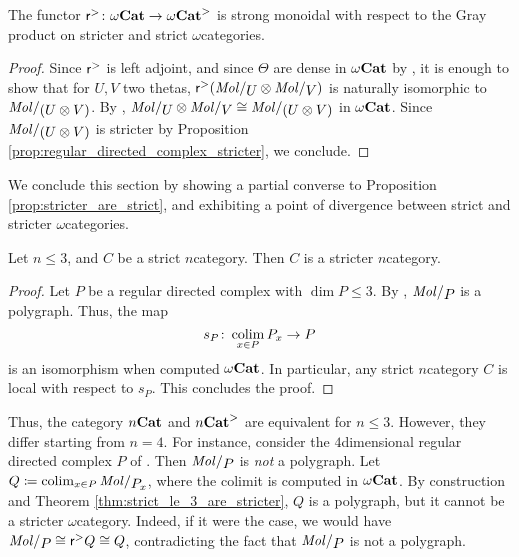 \begin{prop} \label{prop:reflection_to_stricter_monoidal}
    The functor \( \mathsf{r}^{>} \colon {\omega\mathbf{Cat}} \to {\omega\mathbf{Cat}}^> \) is strong monoidal with respect to the Gray product on stricter and strict \( \omega \)\nbd categories.
\end{prop}
\begin{proof}
    Since \( \mathsf{r}^{>} \) is left adjoint, and since \( \Theta \) are dense in \( {\omega\mathbf{Cat}} \) by \cite[Proposition 4.6]{ara2020joint}, it is enough to show that for \( U, V \) two thetas, \( \rcs (\molecin{U} \gray \molecin{V}) \) is naturally isomorphic to \( \molecin{(U \gray V)} \).
    By \cite[Lemma 9.1.16, Proposition 11.2.36]{hadzihasanovic2024combinatorics}, \( \molecin{U} \gray \molecin{V} \cong \molecin{(U \gray V)} \) in \( {\omega\mathbf{Cat}} \).
    Since \( \molecin{(U \gray V)} \) is stricter by Proposition \ref{prop:regular_directed_complex_stricter}, we conclude.
\end{proof}

\noindent We conclude this section by showing a partial converse to Proposition \ref{prop:stricter_are_strict}, and exhibiting a point of divergence between strict and stricter \( \omega \)\nbd categories.

\begin{thm}\label{thm:strict_le_3_are_stricter}
    Let \( n \le 3 \), and \( C \) be a strict \( n \)\nbd category.
    Then \( C \) is a stricter \( n \)\nbd category.
\end{thm}
\begin{proof}
    Let \( P \) be a regular directed complex with \( \dim P \le 3 \).
    By \cite[Corollary 8.4.12]{hadzihasanovic2024combinatorics}, \( \molecin{P} \) is a polygraph.
    Thus, the map
    \begin{equation*}
        s_P \colon \operatorname*{colim}_{x \in P} {P}_{x} \to P 
    \end{equation*}
    is an isomorphism when computed \( {\omega\mathbf{Cat}} \).
    In particular, any strict \( n \)\nbd category \( C \) is local with respect to \( s_P \).
    This concludes the proof.
\end{proof}

\begin{comm} \label{comm:strict_are_not_stricter}
    Thus, the category \( {n\mathbf{Cat}} \) and \( {n\mathbf{Cat}}^> \) are equivalent for \( n \le 3 \).
    However, they differ starting from \( n = 4 \).
    For instance, consider the \( 4 \)\nbd dimensional regular directed complex \( P \) of \cite[Example 8.2.20]{hadzihasanovic2024combinatorics}.
    Then \( \molecin{P} \) is \emph{not} a polygraph.
    Let \( Q \eqdef \colim_{x \in P} \molecin{\imel{P}{x}} \), where the colimit is computed in \( {\omega\mathbf{Cat}} \).
    By construction and Theorem \ref{thm:strict_le_3_are_stricter}, \( Q \) is a polygraph, but it cannot be a stricter \( \omega \)\nbd category.
    Indeed, if it were the case, we would have \( \molecin{P} \cong \rcs Q \cong Q \), contradicting the fact that \( \molecin{P} \) is not a polygraph.
\end{comm}

